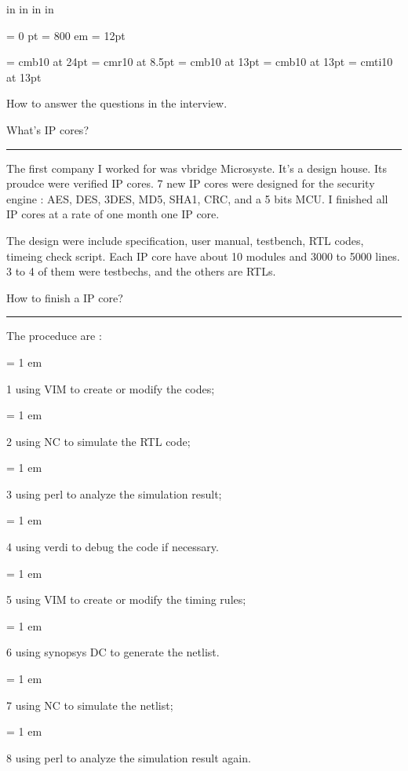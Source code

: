  in     %
 in    %
 in  %
 in  %


\nopagenumbers

\parindent = 0 pt
\emergencystretch = 800 em
\baselineskip = 12pt


\font\FFaa=      cmb10            at 24pt
\font\FFbb=      cmr10            at 8.5pt
\font\FFcc=      cmb10            at 13pt
\font\FFdd=      cmb10            at 13pt
\font\FFee=      cmti10           at 13pt


\bigbreak

\centerline{ \FFaa
How to answer the questions in the interview.
}

{ \medbreak } { \FFcc
What's IP cores?
} { \smallbreak } {\par\noindent\hrule} { \smallbreak }

    The first company I worked for was vbridge Microsyste.
It's a design house. Its proudce were verified IP cores.
7 new IP cores were designed for the security engine : 
AES, DES, 3DES, MD5, SHA1, CRC, and a 5 bits MCU.
I finished all IP cores at a rate of one month one IP core.

The design were include specification, user manual, testbench, 
RTL codes, timeing check script. 
Each IP core have about 10 modules and 3000 to 5000 lines.
3 to 4 of them were testbechs, and the others are RTLs.


{ \medbreak } { \FFcc
How to finish a IP core?
} { \smallbreak } {\par\noindent\hrule} { \smallbreak }

The proceduce are : 

{ \parindent = 1 em \item{1} 
using VIM to create or modify the codes;
}
{ \parindent = 1 em \item{2} 
using NC to simulate the RTL code;
}
{ \parindent = 1 em \item{3} 
using perl to analyze the simulation result;
}
{ \parindent = 1 em \item{4} 
using verdi to debug the code if necessary.
}
{ \parindent = 1 em \item{5} 
using VIM to create or modify the timing rules;
}
{ \parindent = 1 em \item{6} 
using synopsys DC to generate the netlist.
}
{ \parindent = 1 em \item{7} 
using NC to simulate the netlist;
}
{ \parindent = 1 em \item{8} 
using perl to analyze the simulation result again.
}

